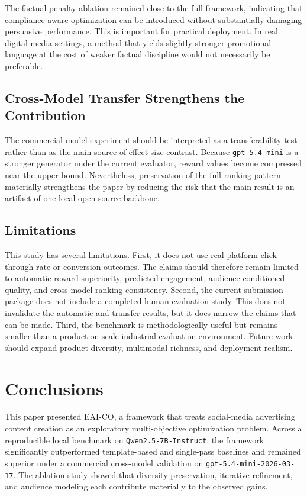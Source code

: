 \documentclass[applsci,article,submit,pdftex,moreauthors]{Definitions/mdpi}
\begin{document}
The factual-penalty ablation remained close to the full framework, indicating that compliance-aware optimization can be introduced without substantially damaging persuasive performance. This is important for practical deployment. In real digital-media settings, a method that yields slightly stronger promotional language at the cost of weaker factual discipline would not necessarily be preferable.

\subsection{Cross-Model Transfer Strengthens the Contribution}

The commercial-model experiment should be interpreted as a transferability test rather than as the main source of effect-size contrast. Because \texttt{gpt-5.4-mini} is a stronger generator under the current evaluator, reward values become compressed near the upper bound. Nevertheless, preservation of the full ranking pattern materially strengthens the paper by reducing the risk that the main result is an artifact of one local open-source backbone.

\subsection{Limitations}

This study has several limitations. First, it does not use real platform click-through-rate or conversion outcomes. The claims should therefore remain limited to automatic reward superiority, predicted engagement, audience-conditioned quality, and cross-model ranking consistency. Second, the current submission package does not include a completed human-evaluation study. This does not invalidate the automatic and transfer results, but it does narrow the claims that can be made. Third, the benchmark is methodologically useful but remains smaller than a production-scale industrial evaluation environment. Future work should expand product diversity, multimodal richness, and deployment realism.

\section{Conclusions}

This paper presented EAI-CO, a framework that treats social-media advertising content creation as an exploratory multi-objective optimization problem. Across a reproducible local benchmark on \texttt{Qwen2.5-7B-Instruct}, the framework significantly outperformed template-based and single-pass baselines and remained superior under a commercial cross-model validation on \texttt{gpt-5.4-mini-2026-03-17}. The ablation study showed that diversity preservation, iterative refinement, and audience modeling each contribute materially to the observed gains.
\end{document}

